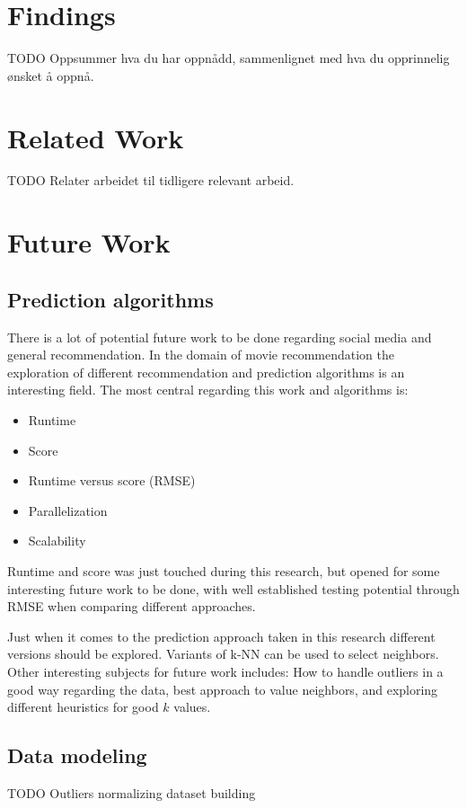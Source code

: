 \section{Findings}
TODO
Oppsummer hva du har oppnådd,
sammenlignet med hva du opprinnelig ønsket å oppnå.

\section{Related Work}
TODO
Relater arbeidet til tidligere relevant arbeid.


\section{Future Work}
\subsection{Prediction algorithms}
There is a lot of potential future work to be done regarding social media and general recommendation. In the domain of movie recommendation the exploration of different recommendation and prediction algorithms is an interesting field. The most central regarding this work and algorithms is:
\begin{itemize}
    \item Runtime
    \item Score
    \item Runtime versus score (RMSE)
    \item Parallelization
    \item Scalability
\end{itemize}
Runtime and score was just touched during this research, but opened for some interesting future work to be done, with well established testing potential through RMSE when comparing different approaches.

Just when it comes to the prediction approach taken in this research different versions should be explored. Variants of k-NN can be used to select neighbors. Other interesting subjects for future work includes: How to handle outliers in a good way regarding the data, best approach to value neighbors, and exploring different heuristics for good $k$ values.


\subsection{Data modeling}
TODO
Outliers  normalizing dataset building


